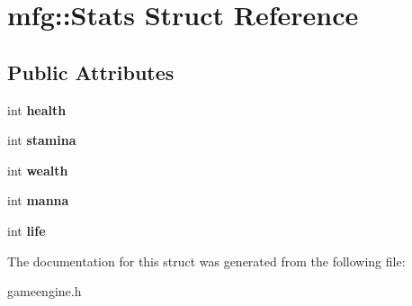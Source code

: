 \hypertarget{structmfg_1_1_stats}{}\section{mfg\+:\+:Stats Struct Reference}
\label{structmfg_1_1_stats}
\subsection*{Public Attributes}
\begin{DoxyCompactItemize}
\item 
\mbox{\label{structmfg_1_1_stats_a1170cdacbc82425eb2801a1220582da3}} 
int {\bfseries health}
\item 
\mbox{\label{structmfg_1_1_stats_aa4a344305e9e1eb4e7ac617c538c3bf1}} 
int {\bfseries stamina}
\item 
\mbox{\label{structmfg_1_1_stats_adc3325405ac0550c7017eb2a369d7c86}} 
int {\bfseries wealth}
\item 
\mbox{\label{structmfg_1_1_stats_adf21a6f756e7cbabb974d5395ada1b89}} 
int {\bfseries manna}
\item 
\mbox{\label{structmfg_1_1_stats_a78e5181b5830ceb7c4c71b32b59578c8}} 
int {\bfseries life}
\end{DoxyCompactItemize}


The documentation for this struct was generated from the following file\+:\begin{DoxyCompactItemize}
\item 
gameengine.\+h\end{DoxyCompactItemize}
